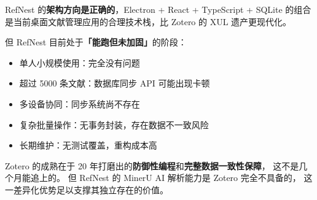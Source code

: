 \documentclass[12pt, a4paper]{article}
\begin{document}
\begin{tcolorbox}[warnbox, title={综合判断}]
RefNest 的\textbf{架构方向是正确的}，Electron + React + TypeScript + SQLite 的组合
是当前桌面文献管理应用的合理技术栈，比 Zotero 的 XUL 遗产更现代化。

但 RefNest 目前处于\textbf{「能跑但未加固」}的阶段：
\begin{itemize}[leftmargin=1em, itemsep=1pt]
  \item 单人小规模使用：完全没有问题
  \item 超过 5000 条文献：数据库同步 API 可能出现卡顿
  \item 多设备协同：同步系统尚不存在
  \item 复杂批量操作：无事务封装，存在数据不一致风险
  \item 长期维护：无测试覆盖，重构成本高
\end{itemize}

Zotero 的成熟在于 20 年打磨出的\textbf{防御性编程}和\textbf{完整数据一致性保障}，
这不是几个月能追上的。
但 RefNest 的 MinerU AI 解析能力是 Zotero 完全不具备的，
这一差异化优势足以支撑其独立存在的价值。
\end{tcolorbox}

\end{document}
